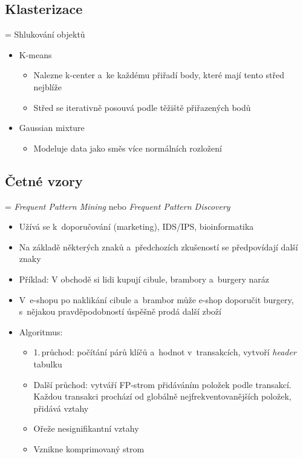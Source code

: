 \subsection{Klasterizace}
= Shlukování objektů
\begin{itemize}
    \item K-means
    \begin{itemize}
        \item Nalezne k-center a~ke každému přiřadí body, které mají tento střed nejblíže
        \item Střed se iterativně posouvá podle těžiště přiřazených bodů
    \end{itemize}
    \item Gaussian mixture
    \begin{itemize}
        \item Modeluje data jako směs více normálních rozložení
    \end{itemize}
\end{itemize}

\subsection{Četné vzory}
= \textit{Frequent Pattern Mining} nebo \textit{Frequent Pattern Discovery}

\begin{itemize}
    \item Užívá se k~doporučování (marketing), IDS/IPS, bioinformatika
    \item Na základě některých znaků a~předchozích zkušeností se předpovídají další znaky
    \item Příklad: V obchodě si lidi kupují cibule, brambory a~burgery naráz
    \item V~e-shopu po naklikání cibule a~brambor může e-shop doporučit burgery, s~nějakou pravděpodobností úspěšně prodá další zboží
    \item Algoritmus:
    \begin{itemize}
        \item 1.\,průchod: počítání párů klíčů a~hodnot v~transakcích, vytvoří \textit{header} tabulku
        \item Další průchod: vytváří FP-strom přidáváním položek podle transakcí. Každou transakci prochází od globálně nejfrekventovanějších položek, přidává vztahy
        \item Ořeže nesignifikantní vztahy
        \item Vznikne komprimovaný strom
    \end{itemize}
\end{itemize}



